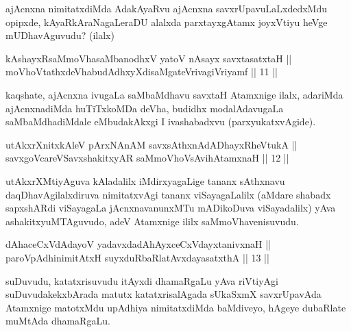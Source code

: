 \begin{artha}
ajAcnxna nimitatxdiMda AdakAyaRvu ajAcnxna savxrUpavuLaLxdedxMdu
opipxde, kAyaRkAraNagaLeraDU alalxda parxtayxgAtamx joyxVtiyu heVge
mUDhavAguvudu? (ilalx)
\end{artha}

\begin{shl}
kAshayxRsaMmoVhasaMbanodhxV yatoV nAsayx savxtasatxtaH || \\
moVhoVtathxdeVhabudAdhxyXdisaMgateVrivagiVriyamf \hfill || 11 ||
 
\end{shl}

\begin{artha}
kaqshate, ajAcnxna ivugaLa saMbaMdhavu savxtaH Atamxnige ilalx,
adariMda ajAcnxnadiMda huTiTxkoMDa deVha, budidhx modalAdavugaLa
saMbaMdhadiMdale eMbudakAkxgi I ivashabadxvu (parxyukatxvAgide).
\end{artha}


\begin{shl}
utAkxrXnitxkAleV pArxNAnAM savxsAthxnAdADhayxRheVtukA || \\
savxgoVcareVSavxshakitxyAR saMmoVhoV\s sAvihA\s \s tamxnaH \hfill || 12 ||
  
\end{shl}

\begin{artha}
utAkxrXMtiyAguva kAladalilx iMdirxyagaLige tananx sAthxnavu
daqDhavAgilalxdiruva nimitatxvAgi tananx viSayagaLalilx (aMdare
shabadx sapxshARdi viSayagaLa jAcnxnavanunxMTu mADikoDuva
viSayadalilx) yAva ashakitxyuMTAguvudo, adeV Atamxnige ililx
saMmoVhavenisuvudu.
\end{artha}


\begin{shl}
dAhaceCxVdAdayoV yadavxdadAhAyxceCxVdayxtanivxnaH || \\
paroVpAdhinimitAtxH suyxduRbaRlatAvxdayasatxthA \hfill || 13 ||
  
\end{shl}

\begin{artha}
suDuvudu, katatxrisuvudu itAyxdi dhamaRgaLu yAva riVtiyAgi
suDuvudakekxbArada matutx katatxrisalAgada sUkaSxmX savxrUpavAda
Atamxnige matotxMdu upAdhiya nimitatxdiMda baMdiveyo, hAgeye dubaRlate
muMtAda dhamaRgaLu.
\end{artha}

